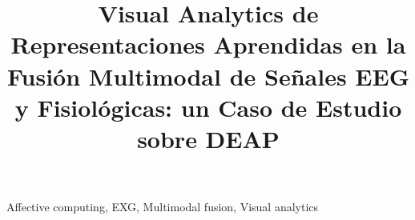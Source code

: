 \documentclass[fleqn]{jaes}
\begin{document}

\title{Visual Analytics de Representaciones Aprendidas en la Fusión Multimodal de Señales EEG y Fisiológicas: un Caso de Estudio sobre DEAP}


\maketitle

\begin{keywords}
Affective computing, EXG, Multimodal fusion, Visual analytics
\end{keywords}
\end{document}
